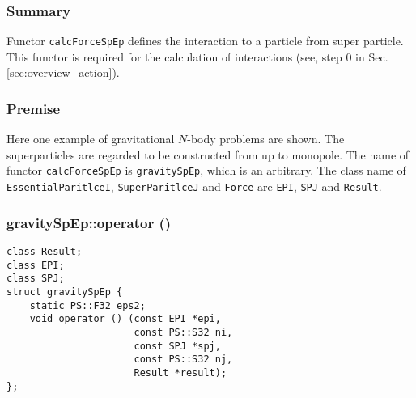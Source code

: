 \subsubsection{Summary}

Functor \texttt{calcForceSpEp} defines the interaction to a particle from super particle.
This functor is required for the calculation of interactions (see, step 0 in Sec. \ref{sec:overview_action}).

\subsubsection{Premise}


Here one example of gravitational $N$-body problems are shown.
The superparticles are regarded to be constructed from up to monopole.
The name of functor \texttt{calcForceSpEp} is \texttt{gravitySpEp}, which is an arbitrary.
The class name of \texttt{EssentialParitlceI}, \texttt{SuperParitlceJ} and \texttt{Force} are \texttt{EPI}, \texttt{SPJ} and \texttt{Result}.

\subsubsection{gravitySpEp::operator ()}

\begin{lstlisting}[caption=calcForceSpEp]
class Result;
class EPI;
class SPJ;
struct gravitySpEp {
    static PS::F32 eps2;
    void operator () (const EPI *epi,
                      const PS::S32 ni,
                      const SPJ *spj,
                      const PS::S32 nj,
                      Result *result);
};
\end{lstlisting}

